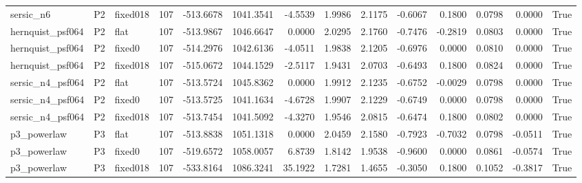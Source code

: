 \begin{tabular}{lllrrrrrrrrrrr}
sersic_n6 & P2 & fixed018 & 107 & -513.6678 & 1041.3541 & -4.5539 & 1.9986 & 2.1175 & -0.6067 & 0.1800 & 0.0798 & 0.0000 & True \\
hernquist_psf064 & P2 & flat & 107 & -513.9867 & 1046.6647 & 0.0000 & 2.0295 & 2.1760 & -0.7476 & -0.2819 & 0.0803 & 0.0000 & True \\
hernquist_psf064 & P2 & fixed0 & 107 & -514.2976 & 1042.6136 & -4.0511 & 1.9838 & 2.1205 & -0.6976 & 0.0000 & 0.0810 & 0.0000 & True \\
hernquist_psf064 & P2 & fixed018 & 107 & -515.0672 & 1044.1529 & -2.5117 & 1.9431 & 2.0703 & -0.6493 & 0.1800 & 0.0824 & 0.0000 & True \\
sersic_n4_psf064 & P2 & flat & 107 & -513.5724 & 1045.8362 & 0.0000 & 1.9912 & 2.1235 & -0.6752 & -0.0029 & 0.0798 & 0.0000 & True \\
sersic_n4_psf064 & P2 & fixed0 & 107 & -513.5725 & 1041.1634 & -4.6728 & 1.9907 & 2.1229 & -0.6749 & 0.0000 & 0.0798 & 0.0000 & True \\
sersic_n4_psf064 & P2 & fixed018 & 107 & -513.7454 & 1041.5092 & -4.3270 & 1.9546 & 2.0815 & -0.6474 & 0.1800 & 0.0802 & 0.0000 & True \\
p3_powerlaw & P3 & flat & 107 & -513.8838 & 1051.1318 & 0.0000 & 2.0459 & 2.1580 & -0.7923 & -0.7032 & 0.0798 & -0.0511 & True \\
p3_powerlaw & P3 & fixed0 & 107 & -519.6572 & 1058.0057 & 6.8739 & 1.8142 & 1.9538 & -0.9600 & 0.0000 & 0.0861 & -0.0574 & True \\
p3_powerlaw & P3 & fixed018 & 107 & -533.8164 & 1086.3241 & 35.1922 & 1.7281 & 1.4655 & -0.3050 & 0.1800 & 0.1052 & -0.3817 & True \\
\bottomrule
\end{tabular}
